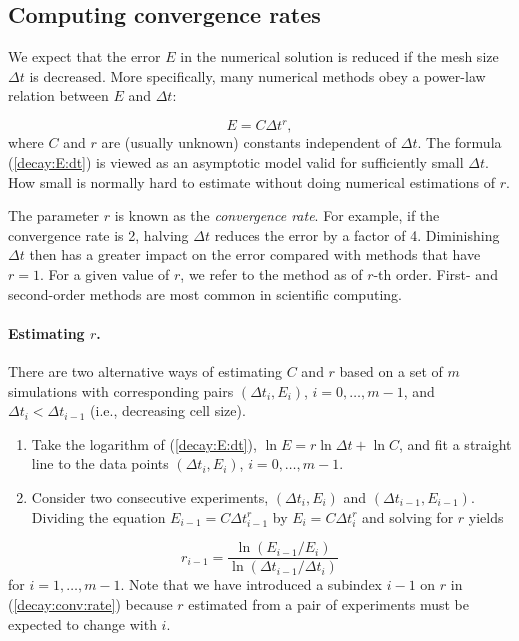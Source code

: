 \documentclass[graybox,sectrefs,envcountresetchap,open=right,final]{svmonodo}
\begin{document}
\subsection{Computing convergence rates}
\label{decay:convergence:rate}


We expect that the error $E$ in the numerical solution is
reduced if the mesh size $\Delta t$ is decreased. More specifically,
many numerical methods obey a power-law relation between $E$ and
$\Delta t$:

\begin{equation}
E = C\Delta t^r,
\label{decay:E:dt}
\end{equation}
where $C$ and $r$ are (usually unknown) constants independent of $\Delta t$.
The formula (\ref{decay:E:dt}) is viewed as an asymptotic model valid for
sufficiently small $\Delta t$. How small is normally hard to estimate
without doing numerical estimations of $r$.

The parameter $r$ is known as the \emph{convergence rate}. For example,
if the convergence rate is 2, halving $\Delta t$ reduces the error by
a factor of 4. Diminishing $\Delta t$ then has a greater impact on
the error compared with methods that have $r=1$. For a given value of $r$,
we refer to the method as of $r$-th order. First- and second-order
methods are most common in scientific computing.

\paragraph{Estimating $r$.}
There are two alternative ways of estimating $C$ and $r$ based on a set of
$m$ simulations with corresponding pairs $(\Delta t_i, E_i)$, $i=0,\ldots,m-1$,
and $\Delta t_{i} < \Delta t_{i-1}$ (i.e., decreasing cell size).

\begin{enumerate}
 \item Take the logarithm of (\ref{decay:E:dt}), $\ln E = r\ln \Delta t + \ln C$, and fit a straight line to the data points $(\Delta t_i, E_i)$, $i=0,\ldots,m-1$.

 \item Consider two consecutive experiments, $(\Delta t_i, E_i)$ and $(\Delta t_{i-1}, E_{i-1})$. Dividing the equation $E_{i-1}=C\Delta t_{i-1}^r$ by $E_{i}=C\Delta t_{i}^r$ and solving for $r$ yields
\end{enumerate}

\noindent
\begin{equation}
r_{i-1} = \frac{\ln (E_{i-1}/E_i)}{\ln (\Delta t_{i-1}/\Delta t_i)}
\label{decay:conv:rate}
\end{equation}
for $i=1,\ldots,m-1$. Note that we have introduced a subindex $i-1$
on $r$ in (\ref{decay:conv:rate}) because $r$ estimated from
a pair of experiments must be expected to change with $i$.
\end{document}
